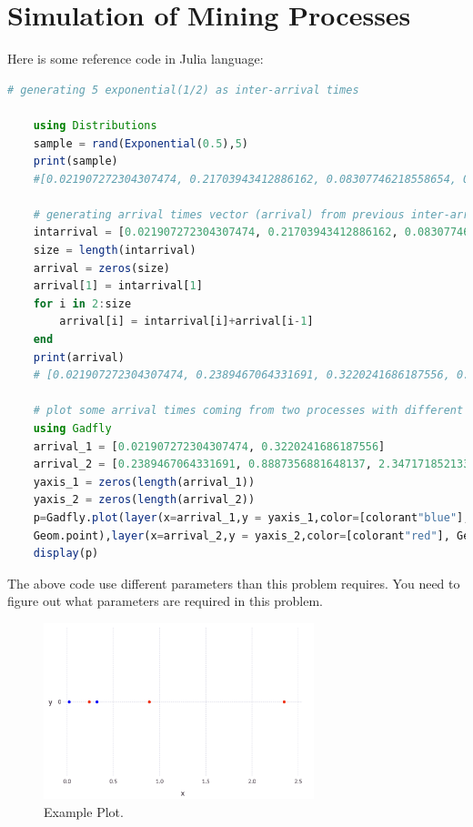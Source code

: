 \documentclass{article}
\begin{document}
\section{Simulation of Mining Processes}

Here is some reference code in Julia language:

\begin{lstlisting}[language=Julia, gobble=4]
    # generating 5 exponential(1/2) as inter-arrival times

    using Distributions
    sample = rand(Exponential(0.5),5)
    print(sample)
    #[0.021907272304307474, 0.21703943412886162, 0.08307746218558654, 0.5667115195460581, 1.4584361639686763]

    # generating arrival times vector (arrival) from previous inter-arrival times vector (intarrival)
    intarrival = [0.021907272304307474, 0.21703943412886162, 0.08307746218558654, 0.5667115195460581, 1.4584361639686763]
    size = length(intarrival)
    arrival = zeros(size)
    arrival[1] = intarrival[1]
    for i in 2:size
        arrival[i] = intarrival[i]+arrival[i-1]
    end
    print(arrival)
    # [0.021907272304307474, 0.2389467064331691, 0.3220241686187556, 0.8887356881648137, 2.34717185213349]

    # plot some arrival times coming from two processes with different color dots
    using Gadfly
    arrival_1 = [0.021907272304307474, 0.3220241686187556]
    arrival_2 = [0.2389467064331691, 0.8887356881648137, 2.34717185213349]
    yaxis_1 = zeros(length(arrival_1))
    yaxis_2 = zeros(length(arrival_2))
    p=Gadfly.plot(layer(x=arrival_1,y = yaxis_1,color=[colorant"blue"],
    Geom.point),layer(x=arrival_2,y = yaxis_2,color=[colorant"red"], Geom.point))
    display(p)
\end{lstlisting}
The above code use different parameters than this problem requires. You need to figure out what parameters are required in this problem.

\begin{figure}[h!]
    \centering
    \includegraphics[width=0.7\textwidth]{plot.png}
    \caption{Example Plot.}\label{fig:ex_plot}
\end{figure}
\end{document}
